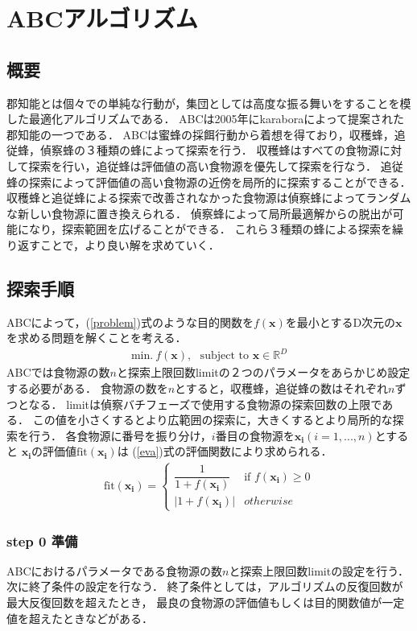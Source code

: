 \section{ABCアルゴリズム}
\subsection{概要}
郡知能とは個々での単純な行動が，集団としては高度な振る舞いをすることを模した最適化アルゴリズムである．
ABCは2005年にkaraboraによって提案された郡知能の一つである\cite{abc}．
ABCは蜜蜂の採餌行動から着想を得ており，収穫蜂，追従蜂，偵察蜂の３種類の蜂によって探索を行う．
収穫蜂はすべての食物源に対して探索を行い，追従蜂は評価値の高い食物源を優先して探索を行なう．
追従蜂の探索によって評価値の高い食物源の近傍を局所的に探索することができる．
収穫蜂と追従蜂による探索で改善されなかった食物源は偵察蜂によってランダムな新しい食物源に置き換えられる．
偵察蜂によって局所最適解からの脱出が可能になり，探索範囲を広げることができる．
これら３種類の蜂による探索を繰り返すことで，より良い解を求めていく．
\subsection{探索手順}
ABCによって，(\ref{problem})式のような目的関数を$f(\boldsymbol{x})$を最小とするD次元の$\boldsymbol{x}$を求める問題を解くことを考える．
\begin{align}
    \label{problem}
\text{min}.~f(\boldsymbol{x}), \text{~~subject to } \boldsymbol{x} \in \mathbb{R} ^D
\end{align}
ABCでは食物源の数$n$と探索上限回数limitの２つのパラメータをあらかじめ設定する必要がある．
食物源の数を$n$とすると，収穫蜂，追従蜂の数はそれぞれ$n$ずつとなる．
limitは偵察バチフェーズで使用する食物源の探索回数の上限である．
この値を小さくするとより広範囲の探索に，大きくするとより局所的な探索を行う．
各食物源に番号を振り分け，$i$番目の食物源を$\boldsymbol{x_{i}}(i = 1,...,n)$とすると
$\boldsymbol{x_{i}}$の評価値$\mathrm{fit}(\boldsymbol{x_{i}})$は
(\ref{eva})式の評価関数により求められる．
\begin{align}
    \label{eva} 
    \mathrm{fit}(\boldsymbol{x_{i}}) =
    \begin{cases}
    \dfrac{1}{1+f(\boldsymbol{x_{i}})} & \text{if } f(\boldsymbol{x_{i}}) \geq 0   \\
    \left\lvert1+f(\boldsymbol{x_{i}})\right\rvert & otherwise
    \end{cases}
\end{align}
\subsubsection*{step 0 準備}
ABCにおけるパラメータである食物源の数$n$と探索上限回数limitの設定を行う．次に終了条件の設定を行なう．
終了条件としては，アルゴリズムの反復回数が最大反復回数を超えたとき，
最良の食物源の評価値もしくは目的関数値が一定値を超えたときなどがある．

